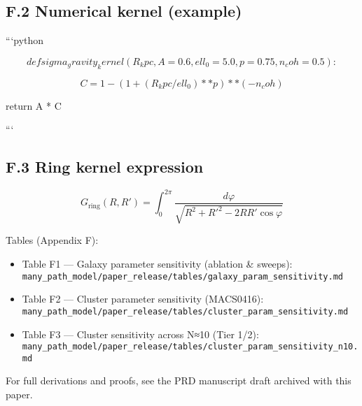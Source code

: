 \documentclass[11pt,a4paper]{article}
\begin{document}
\subsection{F.2 Numerical kernel (example)}


```python

\[
def sigma_gravity_kernel(R_kpc, A=0.6, ell_0=5.0, p=0.75, n_coh=0.5):
\]

\[
C = 1 - (1 + (R_kpc/ell_0)**p)**(-n_coh)
\]

    return A * C

```


\subsection{F.3 Ring kernel expression}


\begin{equation}
G_{\mathrm{ring}}(R, R') = \int_{0}^{2\pi} \frac{d\varphi}{\sqrt{R^2 + R'^2 - 2 R R'\cos\varphi}}
\end{equation}


Tables (Appendix F):

\begin{itemize}
\item Table F1 — Galaxy parameter sensitivity (ablation \& sweeps): \texttt{many\_path\_model/paper\_release/tables/galaxy\_param\_sensitivity.md}
\item Table F2 — Cluster parameter sensitivity (MACS0416): \texttt{many\_path\_model/paper\_release/tables/cluster\_param\_sensitivity.md}
\item Table F3 — Cluster sensitivity across N≈10 (Tier 1/2): \texttt{many\_path\_model/paper\_release/tables/cluster\_param\_sensitivity\_n10.md}
\end{itemize}


For full derivations and proofs, see the PRD manuscript draft archived with this paper.
\end{document}
